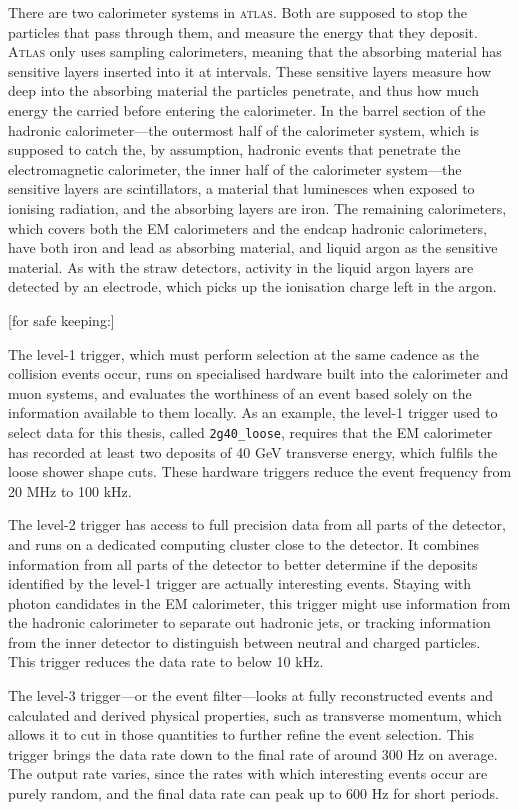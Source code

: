 There are two calorimeter systems in \textsc{atlas}. Both are supposed to stop the particles that pass through them, and measure the energy that they deposit. \textsc{Atlas} only uses sampling calorimeters, meaning that the absorbing material has sensitive layers inserted into it at intervals. These sensitive layers measure how deep into the absorbing material the particles penetrate, and thus how much energy the carried before entering the calorimeter. In the barrel section of the hadronic calorimeter---the outermost half of the calorimeter system, which is supposed to catch the, by assumption, hadronic events that penetrate the electromagnetic calorimeter, the inner half of the calorimeter system---the sensitive layers are scintillators, a material that luminesces when exposed to ionising radiation, and the absorbing layers are iron. The remaining calorimeters, which covers both the EM calorimeters and the endcap hadronic calorimeters, have both iron and lead as absorbing material, and liquid argon as the sensitive material. As with the straw detectors, activity in the liquid argon layers are detected by an electrode, which picks up the ionisation charge left in the argon.

[for safe keeping:]

The level-1 trigger, which must perform selection at the same cadence as the collision events occur, runs on specialised hardware built into the calorimeter and muon systems, and evaluates the worthiness of an event based solely on the information available to them locally. As an example, the level-1 trigger used to select data for this thesis, called \texttt{2g40\_loose}, requires that the EM calorimeter has recorded at least two deposits of 40 GeV transverse energy, which fulfils the loose shower shape cuts. These hardware triggers reduce the event frequency from 20 MHz to 100 kHz.

The level-2 trigger has access to full precision data from all parts of the detector, and runs on a dedicated computing cluster close to the detector. It combines information from all parts of the detector to better determine if the deposits identified by the level-1 trigger are actually interesting events. Staying with photon candidates in the EM calorimeter, this trigger might use information from the hadronic calorimeter to separate out hadronic jets, or tracking information from the inner detector to distinguish between neutral and charged particles. This trigger reduces the data rate to below 10 kHz.

The level-3 trigger---or the event filter---looks at fully reconstructed events and calculated and derived physical properties, such as transverse momentum, which allows it to cut in those quantities to further refine the event selection. This trigger brings the data rate down to the final rate of around 300 Hz on average. The output rate varies, since the rates with which interesting events occur are purely random, and the final data rate can peak up to 600 Hz for short periods.